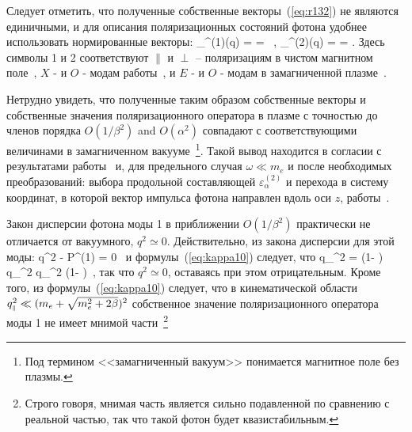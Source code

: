 Следует отметить, что полученные собственные векторы~(\ref{eq:r132}) не являются единичными, и для описания поляризационных состояний фотона удобнее использовать нормированные векторы:
%
\beq
\label{eq:epsilon}
\varepsilon_\alpha^{(1)}(q) =  = 
 \, , \quad
\varepsilon_\alpha^{(2)}(q) =  = 
.
\eeq
\noindent Здесь символы 1 и 2 соответствуют  $\|$ и $\perp$ --  поляризациям в чистом магнитном поле~\cite{Adler:1971}, $X$ - и $O$ -  модам работы~\cite{Mushtukov:2016}, и $E$ - и $O$ -  модам в замагниченной плазме~\cite{Thompson:1996}. 

Нетрудно увидеть, что полученные таким образом собственные векторы и собственные значения поляризационного 
оператора в плазме с точностью до членов порядка  $O(1/\beta^2)$ and $O(\alpha^2)$ совпадают с соответствующими величинами в  замагниченном вакууме~\footnote{Под термином <<замагниченный вакуум>>  понимается магнитное поле без плазмы.}. Такой вывод находится в согласии с результатами работы~\cite{Shabad:1988} и, для предельного случая $\omega \ll m_e$ и после необходимых преобразований: выбора продольной составляющей $\varepsilon^{(2)}_\alpha$ и перехода в систему координат, в которой вектор импульса фотона направлен вдоль оси $z$, работы~\cite{Potekhin:2004}.

Закон дисперсии фотона моды 1 в приближении $O(1/\beta^2)$ практически не отличается от вакуумного, $q^2 \simeq 0$. Действительно, из закона дисперсии для этой моды:
%
\beq
q^2 - {\cal P}^{(1)} = 0 \, 
\label{disper1}
\eeq
\noindent и формулы~(\ref{eq:kappa10}) следует, что
%
\beq
q_{\mprl}^2 = \left (1- \frac{\alpha}{3\pi}  \right) \, q_{\mprp}^2  
\simeq q_{\mprp}^2 \left (1- \frac{\alpha}{3\pi} \right)\, , 
\label{disper12}
\eeq
\noindent так что $q^2 \simeq 0$, оставаясь при этом отрицательным. Кроме того, из формулы~(\ref{eq:kappa10}) следует, что в кинематической области $q^2_{\mbox{\tiny $\|$}} \ll (m_e+\sqrt{m_e^2+2 \beta})^2$ собственное значение поляризационного оператора моды 1 не имеет мнимой части~\footnote{Строго говоря, мнимая часть является сильно подавленной по сравнению с реальной частью, так что такой фотон будет квазистабильным.}

